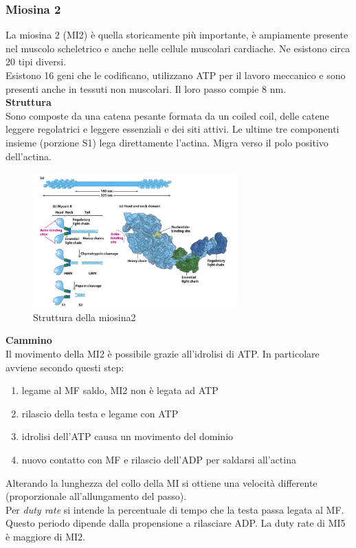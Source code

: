         \subsubsection{Miosina 2}
            La miosina 2 (MI2) è quella storicamente più importante, è ampiamente presente nel muscolo scheletrico e anche nelle cellule muscolari cardiache. Ne esistono circa 20 tipi diversi.    \\
            Esistono 16 geni che le codificano, utilizzano ATP per il lavoro meccanico e sono presenti anche in tessuti non muscolari. Il loro passo compie 8 nm.\\
            
            \textbf{Struttura}\\
            Sono composte da una catena pesante formata da un coiled coil, delle catene leggere regolatrici e leggere essenziali e dei siti attivi. Le ultime tre componenti insieme (porzione S1) lega direttamente l'actina. Migra verso il polo positivo dell'actina.
            \begin{figure}[h]
                \centering
                \includegraphics[width=0.7\textwidth]{images/miosina.JPG}
                \caption{\small Struttura della miosina2}
                \label{fig:mesh1}
            \end{figure}
            
            \textbf{Cammino}\\
                Il movimento della MI2 è possibile grazie all'idrolisi di ATP. In particolare avviene secondo questi step:
                \begin{enumerate}
                    \item legame al MF saldo, MI2 non è legata ad ATP
                    \item rilascio della testa e legame con ATP
                    \item idrolisi dell'ATP causa un movimento del dominio
                    \item nuovo contatto con MF e rilascio dell'ADP per saldarsi all'actina
                \end{enumerate}
                Alterando la lunghezza del collo della MI si ottiene una velocità differente (proporzionale all'allungamento del passo). \\
                Per \textit{duty rate} si intende la percentuale di tempo che la testa passa legata al MF. Questo periodo dipende dalla propensione a rilasciare ADP. La duty rate di MI5 è maggiore di MI2. \\
                
